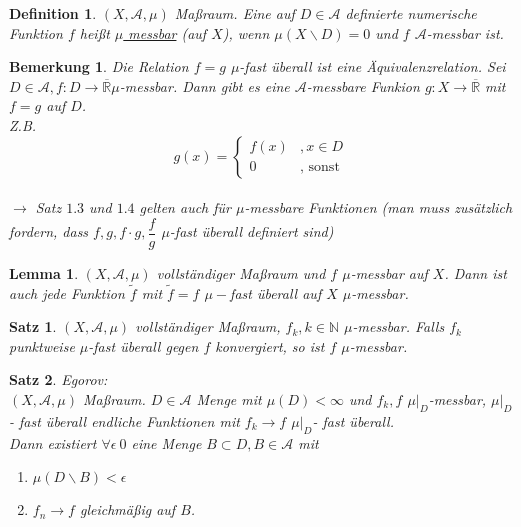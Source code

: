 \documentclass[11pt]{memoir}
\theoremstyle{break}
\newtheorem{Definition}{Definition}[chapter]
\newtheorem{Bemerkung}{Bemerkung}[chapter]
\newtheorem{Lemma}{Lemma}[chapter]
\newtheorem{Satz}{Satz}[chapter]
\begin{document}
\begin{Definition}
$(X, \mathscr A, \mu)$ Maßraum. Eine auf $D \in \mathscr A$ definierte numerische Funktion $f$ heißt \underline{$\mu$ messbar} (auf $X$), wenn $\mu(X \backslash D) = 0$ und $f$ $\mathscr A$-messbar ist.
\end{Definition}

\begin{Bemerkung}
Die Relation $f = g$ $\mu$-fast überall ist eine Äquivalenzrelation. Sei $D \in \mathscr A, f: D \rightarrow \overline{\mathbb R} \mu$-messbar. Dann gibt es eine $\mathscr A$-messbare Funkion $g: X \rightarrow \overline{\mathbb R}$ mit $f = g$ auf $D$. \\
\emph{Z.B.} \\
\begin{equation}
	g(x) = 
	\begin{cases}
		f(x) & , x \in D \\
		0 & \text{, sonst}
	\end{cases}
\end{equation} \\
$\rightarrow$ Satz $1.3$ und $1.4$ gelten auch für $\mu$-messbare Funktionen (man muss zusätzlich fordern, dass $f, g, f \cdotp g, \dfrac{f}{g}$ $ \mu$-fast überall definiert sind)
\end{Bemerkung}


\begin{Lemma}
$(X, \mathscr A, \mu)$ vollständiger Maßraum und $f$ $\mu$-messbar auf $X$. Dann ist auch jede Funktion $\tilde f$ mit $\tilde f = f$ $\mu-$fast überall auf $X$ $\mu$-messbar.
\end{Lemma}


\begin{Satz}
$(X, \mathscr A, \mu)$ vollständiger Maßraum, $f_k, k \in \mathbb N$ $\mu$-messbar. Falls $f_k$ punktweise $\mu$-fast überall gegen $f$ konvergiert, so ist $f$ $\mu$-messbar.
\end{Satz}

\begin{Satz}{\emph{Egorov:}} \\
$(X, \mathscr A, \mu)$ Maßraum. $D \in \mathscr A$ Menge mit $\mu(D) \less \infty$ und $f_k, f$ $ \mu|_D$-messbar, $\mu|_D$ - fast überall endliche Funktionen mit $f_k \rightarrow f$ $\mu|_D$- fast überall. \\
Dann existiert $\forall \epsilon \> 0$ eine Menge $B \subset D, B \in \mathscr A$ mit \\
\begin{enumerate}
	\item $\mu(D\backslash B) \less \epsilon$
	\item $f_n \rightarrow f$ gleichmäßig auf $B$. 
\end{enumerate}
\end{Satz}
\end{document}
